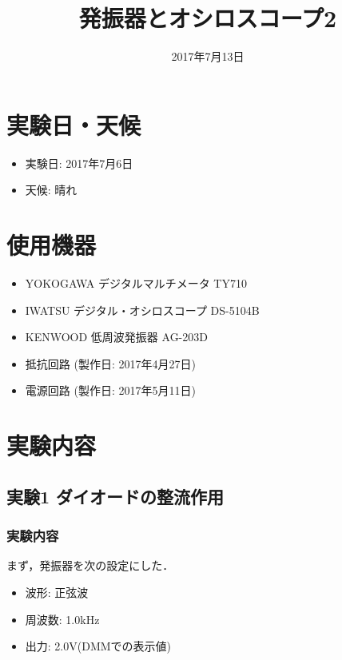 \documentclass[titlepage,a4paper,11pt]{jsarticle}
\title{発振器とオシロスコープ2}
\date{2017年7月13日}
\def\tightlist{\itemsep1pt\parskip0pt\parsep0pt}
\begin{document}
\maketitle

\section{実験日・天候}

\begin{itemize}
    \tightlist
  \item
    実験日: 2017年7月6日
  \item
    天候: 晴れ
\end{itemize}

\section{使用機器}

\begin{itemize}
    \tightlist
  \item
    YOKOGAWA デジタルマルチメータ TY710
  \item
    IWATSU デジタル・オシロスコープ DS-5104B
  \item
    KENWOOD 低周波発振器 AG-203D
  \item
    抵抗回路 (製作日: 2017年4月27日)
  \item
    電源回路 (製作日: 2017年5月11日)
\end{itemize}

\section{実験内容}

\subsection{実験1 ダイオードの整流作用}

\subsubsection{実験内容}

まず，発振器を次の設定にした．

\begin{itemize}
    \tightlist
  \item
    波形: 正弦波
  \item
    周波数: 1.0kHz
  \item
    出力: 2.0V(DMMでの表示値)
\end{itemize}
\end{document}
